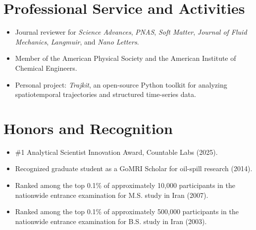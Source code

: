 \documentclass[11pt]{article}
\newlength{\cvindent}
\newenvironment{cvblock}{%
  \begin{list}{}{%
    \setlength{\leftmargin}{\cvindent}%
    \setlength{\rightmargin}{0pt}%
    \setlength{\labelwidth}{0pt}%
    \setlength{\labelsep}{0pt}%
    \setlength{\itemindent}{0pt}%
    \setlength{\listparindent}{0pt}%
    \setlength{\topsep}{0pt}%
    \setlength{\partopsep}{0pt}%
    \setlength{\parsep}{0pt}%
    \setlength{\itemsep}{0pt}%
  }
  \item[]
}{%
  \end{list}
}
\begin{document}
\section*{Professional Service and Activities}
\begin{cvblock}
\begin{itemize}
    \item Journal reviewer for \textit{Science Advances}, \textit{PNAS}, \textit{Soft Matter}, \textit{Journal of Fluid Mechanics}, \textit{Langmuir}, and \textit{Nano Letters}.
    \item Member of the American Physical Society and the American Institute of Chemical Engineers.
    \item Personal project: \textit{Trajkit}, an open-source Python toolkit for analyzing spatiotemporal trajectories and structured time-series data.
\end{itemize}
\end{cvblock}

\section*{Honors and Recognition}
\begin{cvblock}
\begin{itemize}
    \item \#1 Analytical Scientist Innovation Award, Countable Labs (2025).
    \item Recognized graduate student as a GoMRI Scholar for oil-spill research (2014).
    \item Ranked among the top 0.1\% of approximately 10,000 participants in the nationwide entrance examination for M.S. study in Iran (2007).
    \item Ranked among the top 0.1\% of approximately 500,000 participants in the nationwide entrance examination for B.S. study in Iran (2003).
\end{itemize}
\end{cvblock}
\end{document}
